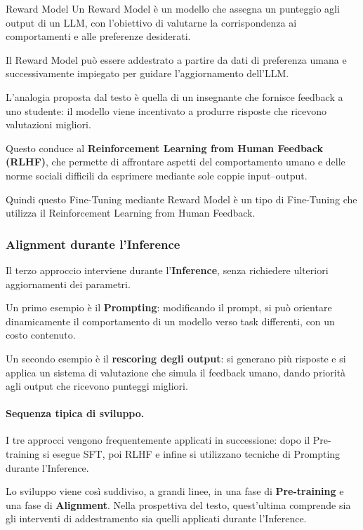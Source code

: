 \begin{definition}{Reward Model}
Un Reward Model è un modello che assegna un punteggio agli output
di un LLM, con l'obiettivo di valutarne la corrispondenza ai
comportamenti e alle preferenze desiderati.
\end{definition}

Il Reward Model può essere addestrato a partire da dati di
preferenza umana e successivamente impiegato per guidare
l'aggiornamento dell'LLM.

L'analogia proposta dal testo è quella di un insegnante che
fornisce feedback a uno studente: il modello viene incentivato
a produrre risposte che ricevono valutazioni migliori.

Questo conduce al
\textbf{Reinforcement Learning from Human Feedback (RLHF)},
che permette di affrontare aspetti del comportamento umano
e delle norme sociali difficili da esprimere mediante sole
coppie input--output.

Quindi questo Fine-Tuning mediante Reward Model è un tipo di Fine-Tuning che utilizza il Reinforcement Learning from Human Feedback.

\subsubsection*{Alignment durante l'Inference}

Il terzo approccio interviene durante l'\textbf{Inference},
senza richiedere ulteriori aggiornamenti dei parametri.

Un primo esempio è il \textbf{Prompting}: modificando il prompt,
si può orientare dinamicamente il comportamento di un modello
verso task differenti, con un costo contenuto.

Un secondo esempio è il \textbf{rescoring degli output}:
si generano più risposte e si applica un sistema di valutazione
che simula il feedback umano, dando priorità agli output
che ricevono punteggi migliori.

\paragraph{Sequenza tipica di sviluppo.}
I tre approcci vengono frequentemente applicati in successione:
dopo il Pre-training si esegue SFT, poi RLHF e infine si utilizzano
tecniche di Prompting durante l'Inference.

Lo sviluppo viene così suddiviso, a grandi linee, in una fase
di \textbf{Pre-training} e una fase di \textbf{Alignment}.
Nella prospettiva del testo, quest'ultima comprende sia gli
interventi di addestramento sia quelli applicati durante
l'Inference.

